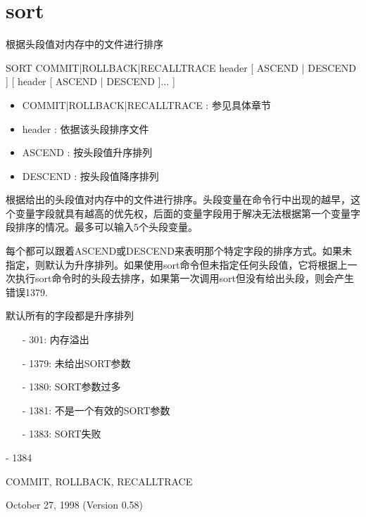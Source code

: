 \section{sort}
\label{cmd:sort}

根据头段值对内存中的文件进行排序

SORT COMMIT|ROLLBACK|RECALLTRACE header [ ASCEND | DESCEND ] [ header [ ASCEND | DESCEND ]... ]

\begin{itemize}
\item COMMIT|ROLLBACK|RECALLTRACE : 参见具体章节
\item header : 依据该头段排序文件 
\item ASCEND : 按头段值升序排列 
\item DESCEND : 按头段值降序排列 
\end{itemize}

根据给出的头段值对内存中的文件进行排序。头段变量在命令行中出现的越早，这个变量字段就具有越高的优先权，后面的变量字段用于解决无法根据第一个变量字段排序的情况。最多可以输入5个头段变量。

每个都可以跟着ASCEND或DESCEND来表明那个特定字段的排序方式。如果未指定，则默认为升序排列。如果使用sort命令但未指定任何头段值，它将根据上一次执行sort命令时的头段去排序，如果第一次调用sort但没有给出头段，则会产生错误1379.

默认所有的字段都是升序排列

\begin{itemize}
\item[-]301:  内存溢出
\item[-]1379: 未给出SORT参数
\item[-]1380: SORT参数过多
\item[-]1381: 不是一个有效的SORT参数
\item[-]1383: SORT失败
\end{itemize}

- 1384

COMMIT, ROLLBACK, RECALLTRACE

October 27, 1998 (Version 0.58)
